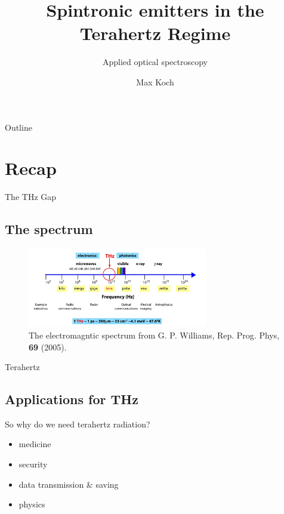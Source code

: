 \documentclass[aspectratio=1610, 9pt]{beamer}
\title{Spintronic emitters in the Terahertz Regime}
\subtitle{Applied optical spectroscopy}
\author[M.~Koch]{Max Koch}
\institute[]{TU Dortmund \\  Fakultät Physik}
\begin{document}
\maketitle

\begin{frame}{Outline}
  \tableofcontents
\end{frame}


\section{Recap}

\begin{frame}{The THz Gap}
  \subsection{The spectrum}
  \begin{center}
    \begin{figure}
      \includegraphics[width=0.7\textwidth]{images/spectrum.png}
      \caption{\textcolor{tugreen}{The electromagntic spectrum} from G. P. Williams, Rep. Prog. Phys, \textbf{69} (2005)\nocite{spectrum_pic}.}
    \end{figure}
  \end{center}
\end{frame}


\begin{frame}{Terahertz}
  \subsection{Applications for THz}
  \begin{center}
    \begin{minipage}[c]{0.5\linewidth}
      So why do we need terahertz radiation?
      \vspace{0.2in}
      \begin{itemize}
        \item medicine \nocite{THzgap_applications}
        \vspace{0.1in}
        \item security \nocite{thz_explosive_detec}
        \vspace{0.1in}
        \item data transmission \& saving \nocite{communication,datasaving}
        \vspace{0.1in}
        \item physics \nocite{wiki_book}
      \end{itemize}
    \end{minipage}
\end{center}
\end{frame}
\end{document}
